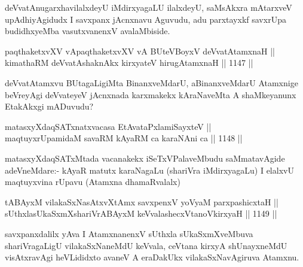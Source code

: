 \begin{artha}
deVvatAnugarxhavilalxdeyU iMdirxyagaLU ilalxdeyU, saMsAkxra mAtarxveV upAdhiyAgidudx I savxpanx jAcnxnavu Aguvudu, adu parxtayxkf savxrUpa budidhxyeMba vasutxvanenxV avalaMbiside.
\end{artha}


\begin{shl}
paqthaketxvXV vA\s paqthaketxvXV vA BUteVBoyxV deVvatAtamxnaH ||  \\
kimathaRM deVvatAshaknAkx kirxyateV hirugAtamxnaH \hfill || 1147 ||  
\end{shl}

\begin{artha}
deVvatAtamxvu BUtagaLigiMta BinanxveMdarU, aBinanxveMdarU Atamxnige beVreyAgi deVvateyeV jAcnxnada karxmakekx kAraNaveMta A shaMkeyanunx EtakAkxgi mADuvudu?
\end{artha}


\begin{shl}
matasxyXdaqSATxnatxvacasa EtAvataPxlamiSayxteV || \\
maqtuyxrUpamidaM savaRM kAyaRM ca karaNAni ca \hfill || 1148 ||  
\end{shl}

\begin{artha}
matasxyXdaqSATxMtada vacanakekx iSeTxVPalaveMbudu saMmatavAgide adeVneMdare:- kAyaR matutx karaNagaLu (shariVra iMdirxyagaLu) I elalxvU maqtuyxvina rUpavu (Atamxna dhamaRvalalx)
\end{artha}

\begin{shl}
tABAyxM vilakaSxNasAtxvXtAmx savxpenxV yoV\s yaM parxpashicxtaH || \\
sUthxlasUkaSxmXshariVrABAyxM keVvalashecxVtanoV\s kirxyaH \hfill || 1149 ||  
\end{shl}

\begin{artha}
savxpanxdalilx yAva I AtamxnanenxV sUthxla sUkaSxmXveMbuva shariVragaLigU vilakaSxNaneMdU keVvala, ceVtana kirxyA shUnayxneMdU visAtxravAgi heVLididxto avaneV A eraDakUkx vilakaSxNavAgiruva Atamxnu.
\end{artha}

